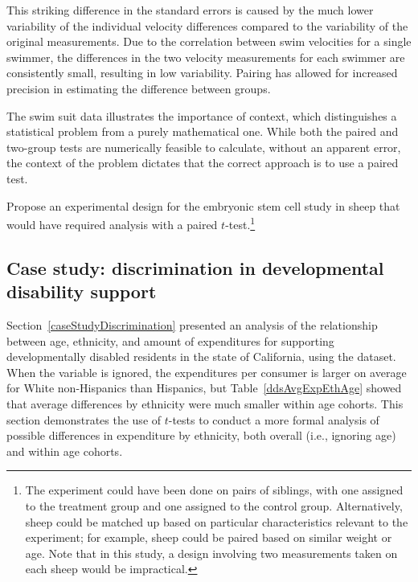 This striking difference in the standard errors is caused by the much lower variability of the individual velocity differences compared to the variability of the original measurements. Due to the correlation between swim velocities for a single swimmer, the differences in the two velocity measurements for each swimmer are consistently small, resulting in low variability. Pairing has allowed for increased precision in estimating the difference between groups.

The swim suit data illustrates the importance of context, which distinguishes a statistical problem from a purely mathematical one. While both the paired and two-group tests are numerically feasible to calculate, without an apparent error, the context of the problem dictates that the correct approach is to use a paired test.

\begin{exercise}{Propose an experimental design for the embryonic stem cell study in sheep that would have required analysis with a paired $t$-test.\footnote{The experiment could have been done on pairs of siblings, with one assigned to the treatment group and one assigned to the control group. Alternatively, sheep could be matched up based on particular characteristics relevant to the experiment; for example, sheep could be paired based on similar weight or age. Note that in this study, a design involving two measurements taken on each sheep would be impractical.}}
\end{exercise}

\subsection{Case study: discrimination in developmental disability support}


Section~\ref{caseStudyDiscrimination} presented an analysis of the relationship between age, ethnicity, and amount of expenditures for supporting developmentally disabled residents in the state of California, using the  dataset. When the variable  is ignored, the expenditures per consumer is larger on average for White non-Hispanics than Hispanics, but Table~\ref{ddsAvgExpEthAge} showed that average differences by ethnicity were much smaller within age cohorts. This section demonstrates the use of $t$-tests to conduct a more formal analysis of possible differences in expenditure by ethnicity, both overall (i.e., ignoring age) and within age cohorts. 

